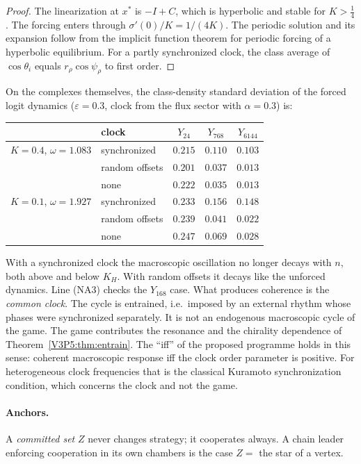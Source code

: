 \begin{proof}
The linearization at $x^{*}$ is $-I+C$, which is hyperbolic and stable for $K>\frac14$. The forcing
enters through $\sigma'(0)/K=1/(4K)$. The periodic solution and its expansion follow from the
implicit function theorem for periodic forcing of a hyperbolic equilibrium. For a partly
synchronized clock, the class average of $\cos\theta_i$ equals $r_\rho\cos\psi_\rho$ to first
order.
\end{proof}

\begin{remark}\label{V3P5:rem:coherent}
On the complexes themselves, the class-density standard deviation of the forced logit dynamics
($\varepsilon=0.3$, clock from the flux sector with $\alpha=0.3$) is:
\begin{center}
\small
\begin{tabular}{llccc}
\toprule
& clock & $Y_{24}$ & $Y_{768}$ & $Y_{6144}$\\
\midrule
$K=0.4$, $\omega=1.083$ & synchronized & $0.215$ & $0.110$ & $0.103$\\
& random offsets & $0.201$ & $0.037$ & $0.013$\\
& none & $0.222$ & $0.035$ & $0.013$\\
\midrule
$K=0.1$, $\omega=1.927$ & synchronized & $0.233$ & $0.156$ & $0.148$\\
& random offsets & $0.239$ & $0.041$ & $0.022$\\
& none & $0.247$ & $0.069$ & $0.028$\\
\bottomrule
\end{tabular}
\end{center}
With a synchronized clock the macroscopic oscillation no longer decays with $n$, both above and
below $K_H$. With random offsets it decays like the unforced dynamics. Line (NA3) checks the
$Y_{168}$ case. What produces coherence is the \emph{common clock}. The cycle is entrained,
i.e.\ imposed by an external rhythm whose phases were synchronized separately. It is not an
endogenous macroscopic cycle of the game. The game contributes the resonance and the chirality
dependence of Theorem~\ref{V3P5:thm:entrain}. The ``iff'' of the proposed programme holds in this
sense: coherent macroscopic response iff the clock order parameter is positive. For
heterogeneous clock frequencies that is the classical Kuramoto synchronization condition, which
concerns the clock and not the game.
\end{remark}

\paragraph{Anchors.} A \emph{committed set} $Z$ never changes strategy; it cooperates always.
A chain leader enforcing cooperation in its own chambers is the case $Z=$ the star of a
vertex.

